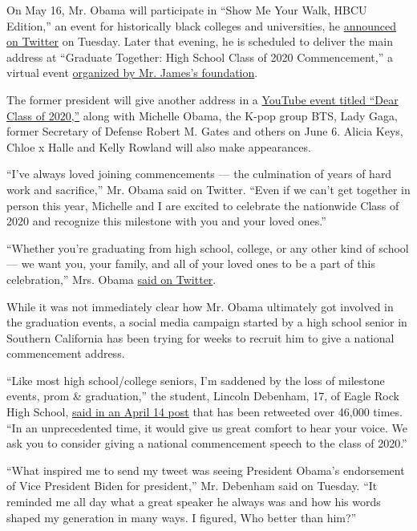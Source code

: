 On May 16, Mr. Obama will participate in ``Show Me Your Walk, HBCU
Edition,'' an event for historically black colleges and universities, he
\href{https://twitter.com/BarackObama/status/1257687918388424707}{announced
on Twitter} on Tuesday. Later that evening, he is scheduled to deliver
the main address at ``Graduate Together: High School Class of 2020
Commencement,'' a virtual event
\href{https://www.nytimes3xbfgragh.onion/2020/04/30/us/oprah-winfrey-graduation-commencement-speeches-virus.html}{organized
by Mr. James's foundation}.

The former president will give another address in a
\href{https://www.youtube.com/watch?v=rxpTjcouaeQ}{YouTube event titled
``Dear Class of 2020,''} along with Michelle Obama, the K-pop group BTS,
Lady Gaga, former Secretary of Defense Robert M. Gates and others on
June 6. Alicia Keys, Chloe x Halle and Kelly Rowland will also make
appearances.

``I've always loved joining commencements --- the culmination of years
of hard work and sacrifice,'' Mr. Obama said on Twitter. ``Even if we
can't get together in person this year, Michelle and I are excited to
celebrate the nationwide Class of 2020 and recognize this milestone with
you and your loved ones.''

``Whether you're graduating from high school, college, or any other kind
of school --- we want you, your family, and all of your loved ones to be
a part of this celebration,'' Mrs. Obama
\href{https://twitter.com/MichelleObama/status/1257693192645992450}{said
on Twitter}.

While it was not immediately clear how Mr. Obama ultimately got involved
in the graduation events, a social media campaign started by a high
school senior in Southern California has been trying for weeks to
recruit him to give a national commencement address.

``Like most high school/college seniors, I'm saddened by the loss of
milestone events, prom \& graduation,'' the student, Lincoln Debenham,
17, of Eagle Rock High School,
\href{https://twitter.com/lincolnjackd/status/1250264222514069506}{said
in an April 14 post} that has been retweeted over 46,000 times. ``In an
unprecedented time, it would give us great comfort to hear your voice.
We ask you to consider giving a national commencement speech to the
class of 2020.''

``What inspired me to send my tweet was seeing President Obama's
endorsement of Vice President Biden for president,'' Mr. Debenham said
on Tuesday. ``It reminded me all day what a great speaker he always was
and how his words shaped my generation in many ways. I figured, Who
better than him?''

